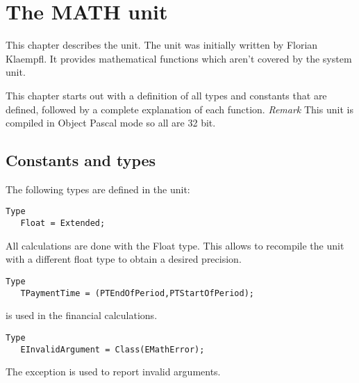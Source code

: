 %
%
%
%
%
\chapter{The MATH unit}

This chapter describes the  unit. The  unit
was initially written by Florian Klaempfl. It provides mathematical
functions which aren't covered by the system unit.

This chapter starts out with a definition of all types and constants
that are defined, followed by a complete explanation of each function.
{\em Remark} This unit is compiled in Object Pascal mode so all
 are 32 bit.

\section{Constants and types}

The following types are defined in the  unit:
\begin{verbatim}
Type
   Float = Extended;
\end{verbatim}
All calculations are done with the Float type. This allows to
recompile the unit with a different float type to obtain a
desired precision.
\begin{verbatim}
Type
   TPaymentTime = (PTEndOfPeriod,PTStartOfPeriod);
\end{verbatim}
 is used in the financial calculations.
\begin{verbatim}
Type
   EInvalidArgument = Class(EMathError);
\end{verbatim}
The  exception is used to report invalid arguments.
